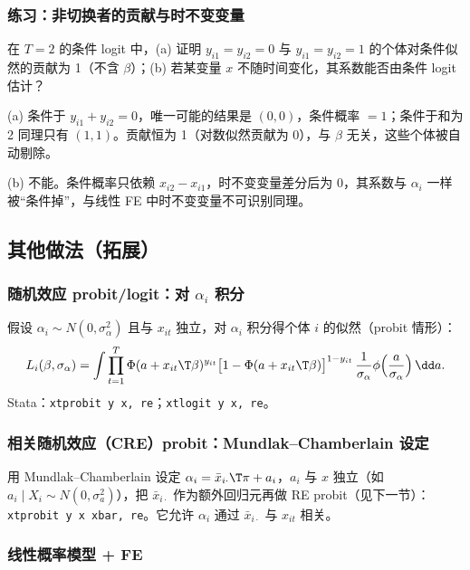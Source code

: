 \subsubsection{练习：非切换者的贡献与时不变变量}

\begin{prac}\label{pr:U11b-clogit}
在 $T=2$ 的条件 logit 中，(a) 证明 $y_{i1}=y_{i2}=0$ 与 $y_{i1}=y_{i2}=1$ 的个体对条件似然的贡献为 1（不含 $\beta$）；(b) 若某变量 $x$ 不随时间变化，其系数能否由条件 logit 估计？

\answer (a) 条件于 $y_{i1}+y_{i2}=0$，唯一可能的结果是 $(0,0)$，条件概率 $=1$；条件于和为 2 同理只有 $(1,1)$。贡献恒为 1（对数似然贡献为 0），与 $\beta$ 无关，这些个体被自动剔除。

(b) 不能。条件概率只依赖 $x_{i2}-x_{i1}$，时不变变量差分后为 0，其系数与 $\alpha_i$ 一样被“条件掉”，与线性 FE 中时不变变量不可识别同理。
\end{prac}

\subsection{其他做法（拓展）}

\subsubsection{随机效应 probit/logit：对 \texorpdfstring{$\alpha_i$}{alpha\_i} 积分}

假设 $\alpha_i\sim N(0,\sigma_\alpha^2)$ 且与 $x_{it}$ 独立，对 $\alpha_i$ 积分得个体 $i$ 的似然（probit 情形）：
\[
L_i(\beta,\sigma_\alpha)=\int\prod_{t=1}^T\Phi(a+x_{it}\T\beta)^{y_{it}}\bigl[1-\Phi(a+x_{it}\T\beta)\bigr]^{1-y_{it}}\,\frac1{\sigma_\alpha}\phi\Bigl(\frac a{\sigma_\alpha}\Bigr)\,\dd a .
\]
Stata：\texttt{xtprobit y x, re}；\texttt{xtlogit y x, re}。

\subsubsection{相关随机效应（CRE）probit：Mundlak--Chamberlain 设定}

用 Mundlak--Chamberlain 设定 $\alpha_i=\bar x_{i\cdot}\T\pi+a_i$，$a_i$ 与 $x$ 独立（如 $a_i\mid X_i\sim N(0,\sigma_a^2)$），把 $\bar x_{i\cdot}$ 作为额外回归元再做 RE probit（见下一节）：\texttt{xtprobit y x xbar, re}。它允许 $\alpha_i$ 通过 $\bar x_{i\cdot}$ 与 $x_{it}$ 相关。

\subsubsection{线性概率模型 + FE}

